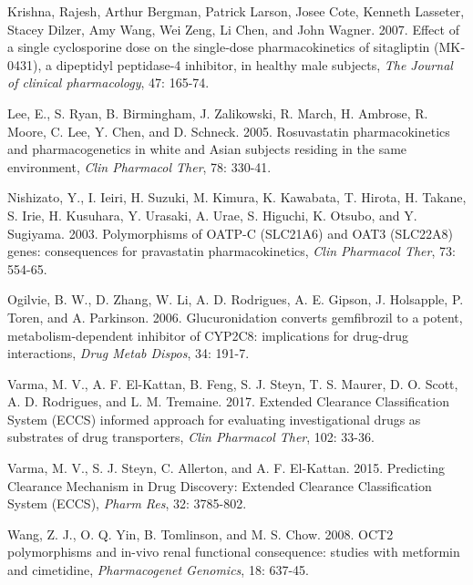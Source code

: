 \documentclass[
  11pt,
  krantz2, a4paper, twoside]{krantz}
\begin{document}
Krishna, Rajesh, Arthur Bergman, Patrick Larson, Josee Cote, Kenneth
Lasseter, Stacey Dilzer, Amy Wang, Wei Zeng, Li Chen, and John Wagner.
2007. \textquotesingle Effect of a single cyclosporine dose on the single‐dose
pharmacokinetics of sitagliptin (MK‐0431), a dipeptidyl peptidase‐4
inhibitor, in healthy male subjects\textquotesingle, \emph{The Journal of clinical
pharmacology}, 47: 165-74.

Lee, E., S. Ryan, B. Birmingham, J. Zalikowski, R. March, H. Ambrose, R.
Moore, C. Lee, Y. Chen, and D. Schneck. 2005. \textquotesingle Rosuvastatin
pharmacokinetics and pharmacogenetics in white and Asian subjects
residing in the same environment\textquotesingle, \emph{Clin Pharmacol Ther}, 78: 330-41.

Nishizato, Y., I. Ieiri, H. Suzuki, M. Kimura, K. Kawabata, T. Hirota,
H. Takane, S. Irie, H. Kusuhara, Y. Urasaki, A. Urae, S. Higuchi, K.
Otsubo, and Y. Sugiyama. 2003. \textquotesingle Polymorphisms of OATP-C (SLC21A6) and
OAT3 (SLC22A8) genes: consequences for pravastatin pharmacokinetics\textquotesingle,
\emph{Clin Pharmacol Ther}, 73: 554-65.

Ogilvie, B. W., D. Zhang, W. Li, A. D. Rodrigues, A. E. Gipson, J.
Holsapple, P. Toren, and A. Parkinson. 2006. \textquotesingle Glucuronidation converts
gemfibrozil to a potent, metabolism-dependent inhibitor of CYP2C8:
implications for drug-drug interactions\textquotesingle, \emph{Drug Metab Dispos}, 34:
191-7.

Varma, M. V., A. F. El-Kattan, B. Feng, S. J. Steyn, T. S. Maurer, D. O.
Scott, A. D. Rodrigues, and L. M. Tremaine. 2017. \textquotesingle Extended Clearance
Classification System (ECCS) informed approach for evaluating
investigational drugs as substrates of drug transporters\textquotesingle, \emph{Clin
Pharmacol Ther}, 102: 33-36.

Varma, M. V., S. J. Steyn, C. Allerton, and A. F. El-Kattan. 2015.
\textquotesingle Predicting Clearance Mechanism in Drug Discovery: Extended Clearance
Classification System (ECCS)\textquotesingle, \emph{Pharm Res}, 32: 3785-802.

Wang, Z. J., O. Q. Yin, B. Tomlinson, and M. S. Chow. 2008. \textquotesingle OCT2
polymorphisms and in-vivo renal functional consequence: studies with
metformin and cimetidine\textquotesingle, \emph{Pharmacogenet Genomics}, 18: 637-45.
\end{document}
